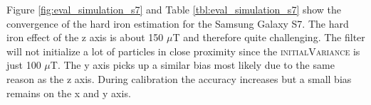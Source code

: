 \begin{table}[H]
    \centering
    \caption{Estimated hard iron bias in $\mu T$ with different methods on the Google Pixel 2.}
    \label{tbl:eval_simulation_pixel2}
\end{table}

Figure \ref{fig:eval_simulation_s7} and Table \ref{tbl:eval_simulation_s7} show the convergence of the hard iron estimation for the Samsung Galaxy S7. The hard iron effect of the z axis is about 150 $\mu$T and therefore quite challenging. The filter will not initialize a lot of particles in close proximity since the \textsc{initialVariance} is just 100 $\mu$T. The y axis picks up a similar bias most likely due to the same reason as the z axis. During calibration the accuracy increases but a small bias remains on the x and y axis.

